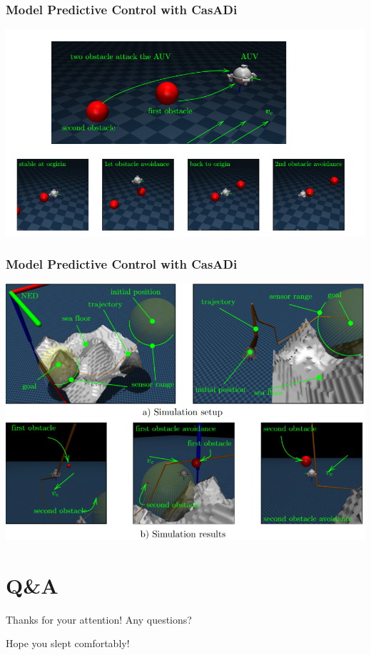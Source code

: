 \documentclass[9pt]{beamer}
\begin{document}
		\begin{frame}
			\frametitle{Model Predictive Control with CasADi}
			\begin{center}
				\includegraphics[width=0.9\linewidth, fbox]{images/mjc-odin2.png}
			\end{center}
		\end{frame}
	
		\begin{frame}
			\frametitle{Model Predictive Control with CasADi}
			\begin{center}
				\includegraphics[width=0.9\linewidth, fbox]{images/mjc-odin4.png}
			\end{center}
		\end{frame}
	
	
	\section{Q\&A}


	

	

	
	\begin{frame}{Thanks for your attention! Any questions?}%
		\begin{center}
			\Huge Hope you slept comfortably!
		\end{center}
	\end{frame}
	
\end{document}
